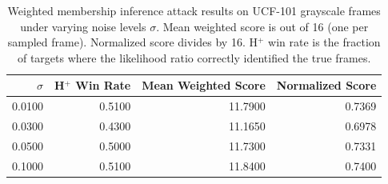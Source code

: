 \begin{table}
\caption{Weighted membership inference attack results on UCF-101 grayscale frames under varying noise levels $\sigma$. Mean weighted score is out of 16 (one per sampled frame). Normalized score divides by 16. H$^+$ win rate is the fraction of targets where the likelihood ratio correctly identified the true frames.}
\label{tab:attack_results}
\begin{tabular}{rrrr}
\toprule
$\sigma$ & H$^+$ Win Rate & Mean Weighted Score & Normalized Score \\
\midrule
0.0100 & 0.5100 & 11.7900 & 0.7369 \\
0.0300 & 0.4300 & 11.1650 & 0.6978 \\
0.0500 & 0.5000 & 11.7300 & 0.7331 \\
0.1000 & 0.5100 & 11.8400 & 0.7400 \\
\bottomrule
\end{tabular}
\end{table}
